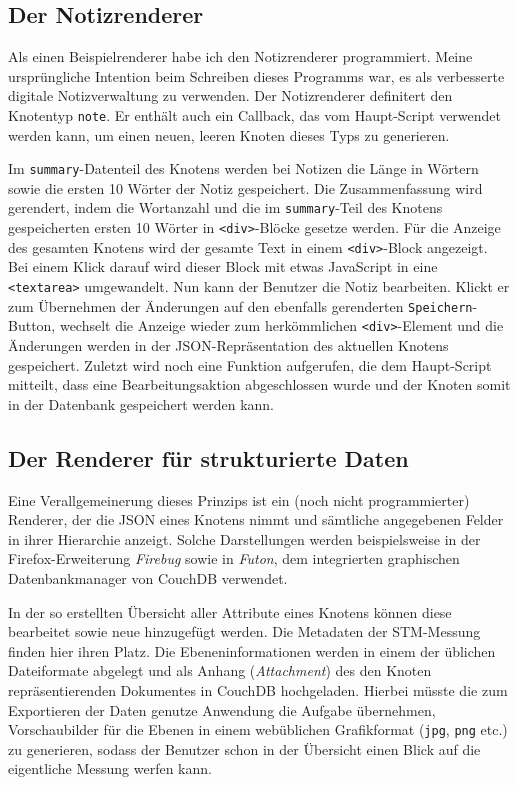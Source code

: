 \documentclass[12pt,ngerman,a4]{scrartcl}
\newcommand{\code}[1]{\texttt{#1}}
\begin{document}
\subsection{Der Notizrenderer}
Als einen Beispielrenderer habe ich den Notizrenderer programmiert. Meine ursprüngliche Intention beim Schreiben dieses Programms war, es als verbesserte digitale Notizverwaltung zu verwenden. Der Notizrenderer definitert den Knotentyp \code{note}. Er enthält auch ein Callback, das vom Haupt-Script verwendet werden kann, um einen neuen, leeren Knoten dieses Typs zu generieren.

Im \code{summary}-Datenteil des Knotens werden bei Notizen die Länge in Wörtern sowie die ersten 10 Wörter der Notiz gespeichert. Die Zusammenfassung wird gerendert, indem die Wortanzahl und die im \code{summary}-Teil des Knotens gespeicherten ersten 10 Wörter in \code{<div>}-Blöcke gesetze werden. Für die Anzeige des gesamten Knotens wird der gesamte Text in einem \code{<div>}-Block angezeigt. Bei einem Klick darauf wird dieser Block mit etwas JavaScript in eine \code{<textarea>} umgewandelt. Nun kann der Benutzer die Notiz bearbeiten. Klickt er zum Übernehmen der Änderungen auf den ebenfalls gerenderten \code{Speichern}-Button, wechselt die Anzeige wieder zum herkömmlichen \code{<div>}-Element und die Änderungen werden in der JSON-Repräsentation des aktuellen Knotens gespeichert. Zuletzt wird noch eine Funktion aufgerufen, die dem Haupt-Script mitteilt, dass eine Bearbeitungsaktion abgeschlossen wurde und der Knoten somit in der Datenbank gespeichert werden kann.
\subsection{Der Renderer für strukturierte Daten}
Eine Verallgemeinerung dieses Prinzips ist ein (noch nicht programmierter) Renderer, der die JSON eines Knotens nimmt und sämtliche angegebenen Felder in ihrer Hierarchie anzeigt. Solche Darstellungen werden beispielsweise in der Firefox-Erweiterung \emph{Firebug}\cite{firebug} sowie in \emph{Futon}\cite{futon}, dem integrierten graphischen Datenbankmanager von CouchDB verwendet.

In der so erstellten Übersicht aller Attribute eines Knotens können diese bearbeitet sowie neue hinzugefügt werden. Die Metadaten der STM-Messung finden hier ihren Platz. Die Ebeneninformationen werden in einem der üblichen Dateiformate abgelegt und als Anhang (\emph{Attachment}) des den Knoten repräsentierenden Dokumentes in CouchDB hochgeladen. Hierbei müsste die zum Exportieren der Daten genutze Anwendung die Aufgabe übernehmen, Vorschaubilder für die Ebenen in einem webüblichen Grafikformat (\code{jpg}, \code{png} etc.) zu generieren, sodass der Benutzer schon in der Übersicht einen Blick auf die eigentliche Messung werfen kann.
\end{document}
